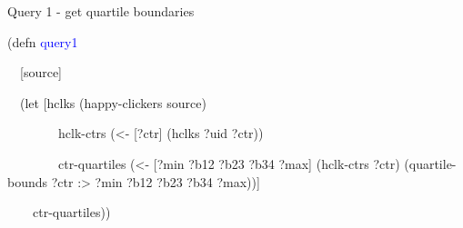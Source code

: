 \documentclass{beamer}
\begin{document}
\begin{frame}{Query 1 - get quartile boundaries}

\begin{small}
{\ttfamily\color{black}
\textcolor[rgb]{0.54901963,0.54901963,0.54901963}{(}\textcolor[rgb]{0.49803922,0.0,0.49803922}{defn}
\textcolor{blue}{query1}}

{\ttfamily\color{black}
\ \ [source]}

{\ttfamily\color{black}
\ \ \textcolor[rgb]{0.54901963,0.54901963,0.54901963}{(}\textcolor[rgb]{0.49803922,0.0,0.49803922}{let}
[hclks
\textcolor[rgb]{0.54901963,0.54901963,0.54901963}{(}happy-clickers
source\textcolor[rgb]{0.54901963,0.54901963,0.54901963}{)}}

{\ttfamily\color{black}
\ \ \ \ \ \ \ \ hclk-ctrs
\textcolor[rgb]{0.54901963,0.54901963,0.54901963}{(}{\textless}- [?ctr]
\textcolor[rgb]{0.54901963,0.54901963,0.54901963}{(}hclks ?uid
?ctr\textcolor[rgb]{0.54901963,0.54901963,0.54901963}{))}}

{\ttfamily\color{black}
\ \ \ \ \ \ \ \ ctr-quartiles
\textcolor[rgb]{0.54901963,0.54901963,0.54901963}{(}{\textless}- [?min
?b12 ?b23 ?b34 ?max]
\textcolor[rgb]{0.54901963,0.54901963,0.54901963}{(}hclk-ctrs
?ctr\textcolor[rgb]{0.54901963,0.54901963,0.54901963}{)}
\textcolor[rgb]{0.54901963,0.54901963,0.54901963}{(}quartile-bounds
?ctr \textcolor[rgb]{0.0,0.54509807,0.54509807}{:{\textgreater}} ?min
?b12 ?b23 ?b34
?max\textcolor[rgb]{0.54901963,0.54901963,0.54901963}{))}]}

{\ttfamily\color{black}
\ \ \ \ ctr-quartiles\textcolor[rgb]{0.54901963,0.54901963,0.54901963}{))}}
\end{small}

\end{frame}
\end{document}
